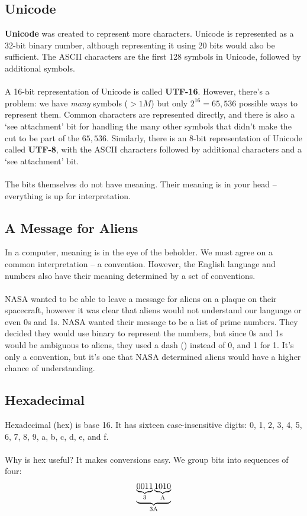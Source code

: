 \documentclass[]{article}
\theoremstyle{definition}
\newcommand{\lecture}[1]{\marginpar{{\footnotesize $\leftarrow$ \underline{#1}}}}
\begin{document}
		\subsection{Unicode}
			\textbf{Unicode} was created to represent more characters. Unicode is represented as a 32-bit binary number, although representing it using 20 bits would also be sufficient. The ASCII characters are the first 128 symbols in Unicode, followed by additional symbols.
			\\ \\
			A 16-bit representation of Unicode is called \textbf{UTF-16}. However, there's a problem: we have \emph{many} symbols ($> 1M$) but only $2^{16} = 65,536$ possible ways to represent them. Common characters are represented directly, and there is also a `see attachment' bit for handling the many other symbols that didn't make the cut to be part of the $65,536$. Similarly, there is an 8-bit representation of Unicode called \textbf{UTF-8}, with the ASCII characters followed by additional characters and a `see attachment' bit.
			\\ \\
			The bits themselves do not have meaning. Their meaning is in your head -- everything is up for interpretation.
		\subsection{A Message for Aliens} \lecture{January 9, 2013}
			In a computer, meaning is in the eye of the beholder. We must agree on a common interpretation -- a convention. However, the English language and numbers also have their meaning determined by a set of conventions.
			\\ \\
			NASA wanted to be able to leave a message for aliens on a plaque on their spacecraft, however it was clear that aliens would not understand our language or even 0s and 1s. NASA wanted their message to be a list of prime numbers. They decided they would use binary to represent the numbers, but since 0s and 1s would be ambiguous to aliens, they used a dash (\textemdash) instead of 0, and 1 for 1. It's only a convention, but it's one that NASA determined aliens would have a higher chance of understanding.
		\subsection{Hexadecimal}
			Hexadecimal (hex) is base 16. It has sixteen case-insensitive digits: 0, 1, 2, 3, 4, 5, 6, 7, 8, 9, a, b, c, d, e, and f.
			\\ \\
			Why is hex useful? It makes conversions easy. We group bits into sequences of four:
			\begin{align*}
			  \underbrace{\underbrace{0011}_{3} \underbrace{1010}_{\text A}}_{\text{3A}}
			\end{align*}
\end{document}

